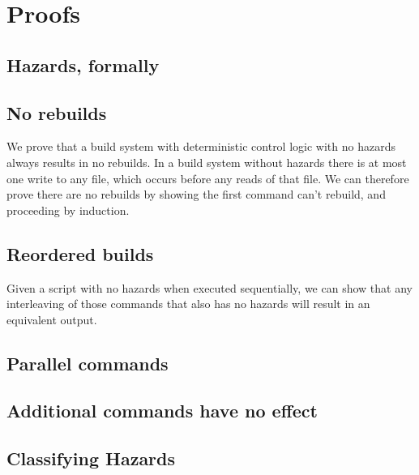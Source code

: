 \section{Proofs}

\subsection{Hazards, formally}

\subsection{No rebuilds}
\label{sec:proof:no_rebuild}

We prove that a build system with deterministic control logic with no hazards always results in no rebuilds.
In a build system without hazards there is at most one write to any file, which occurs before any reads of that file. We can therefore prove there are no rebuilds by showing the first command can't rebuild, and proceeding by induction.

\subsection{Reordered builds}
\label{sec:proof:reorder}

Given a script with no hazards when executed sequentially, we can show that any interleaving of those commands that also has no hazards will result in an equivalent output.

\subsection{Parallel commands}
\label{sec:proof:parallel}

\subsection{Additional commands have no effect}
\label{sec:proof:additional}

\subsection{Classifying Hazards}
\label{sec:proof:classify_hazard}
